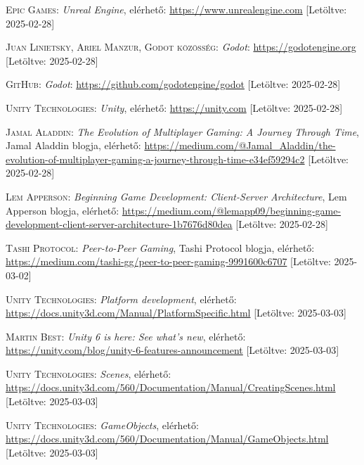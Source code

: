 \documentclass[]{thesis-ekf}
\theoremstyle{definition}
\theoremstyle{remark}
\begin{document}
\begin{thebibliography}{2}
	
	\textsc{Epic Games}: \emph{Unreal Engine}, elérhető: \url{https://www.unrealengine.com} [Letöltve: 2025-02-28]
	
	\textsc{Juan Linietsky, Ariel Manzur, Godot közösség}: \emph{Godot}: \url{https://godotengine.org} [Letöltve: 2025-02-28]
	
	\textsc{GitHub}: \emph{Godot}: \url{https://github.com/godotengine/godot} [Letöltve: 2025-02-28]
	
	\textsc{Unity Technologies}: \emph{Unity}, elérhető: \url{https://unity.com} [Letöltve: 2025-02-28]
	
	\textsc{Jamal Aladdin}: \emph{The Evolution of Multiplayer Gaming: A Journey Through Time}, Jamal Aladdin blogja, elérhető:
	\url{https://medium.com/@Jamal_Aladdin/the-evolution-of-multiplayer-gaming-a-journey-through-time-e34ef59294c2} [Letöltve: 2025-02-28]
	
	\textsc{Lem Apperson}: \emph{Beginning Game Development: Client-Server Architecture}, Lem Apperson blogja, elérhető:
	\url{https://medium.com/@lemapp09/beginning-game-development-client-server-architecture-1b7676d80dea} [Letöltve: 2025-02-28]
	
	\textsc{Tashi Protocol}: \emph{Peer-to-Peer Gaming}, Tashi Protocol blogja, elérhető:
	\url{https://medium.com/tashi-gg/peer-to-peer-gaming-9991600c6707} [Letöltve: 2025-03-02]
	
	\textsc{Unity Technologies}: \emph{Platform development}, elérhető:
	\url{https://docs.unity3d.com/Manual/PlatformSpecific.html} [Letöltve: 2025-03-03]
	
	\textsc{Martin Best}: \emph{Unity 6 is here: See what's new}, elérhető:
	\url{https://unity.com/blog/unity-6-features-announcement} [Letöltve: 2025-03-03]
	
	\textsc{Unity Technologies}: \emph{Scenes}, elérhető:
	\url{https://docs.unity3d.com/560/Documentation/Manual/CreatingScenes.html} [Letöltve: 2025-03-03]
	
	\textsc{Unity Technologies}: \emph{GameObjects}, elérhető:
	\url{https://docs.unity3d.com/560/Documentation/Manual/GameObjects.html} [Letöltve: 2025-03-03]
	

\end{thebibliography}
\end{document}
